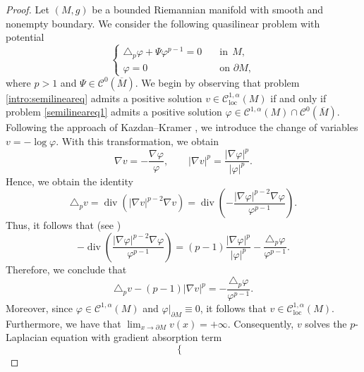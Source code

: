 \documentclass{article}
\begin{document}
\begin{proof} Let $(M,g)$ be a bounded Riemannian manifold with smooth and nonempty boundary.
We consider the following quasilinear problem with potential
\begin{equation}\label{semilineareq1}
\begin{cases}
\triangle_p \varphi + \Psi \varphi^{p-1} = 0 \quad & \text{in} \ \ M,\\
\varphi =0 & \text{on } \partial M,
\end{cases}
\end{equation}
where $p > 1$ and $\Psi \in \mathcal{C}^0(\overline{M})$. We begin by observing that problem \eqref{intro:semilineareq} admits a positive solution $v \in \mathcal{C}^{1,\alpha}_{\mathrm{loc}}(M)$ if and only if problem \eqref{semilineareq1} admits a positive solution $\varphi \in \mathcal{C}^{1,\alpha}(M)\cap \mathcal{C}^0(\overline{M})$. Following the approach of Kazdan--Kramer \cite{KazdanKramer}, we introduce the change of variables $v=-\log \varphi$. With this transformation, we obtain
\[
    \nabla v = -\frac{\nabla \varphi}{\varphi},
    \qquad 
    | \nabla v |^p = \frac{ |\nabla \varphi |^p}{|\varphi|^p}.
\]
Hence, we obtain the identity
    \begin{equation*}
    \triangle_p v 
    = \operatorname{div}( | \nabla v |^{p-2}\nabla v)
    = \operatorname{div}\!\left(
        -\frac{ |\nabla \varphi |^{p-2}\nabla \varphi}{\varphi^{p-1}}
      \right).
\end{equation*}
Thus, it follows that (see \cite[Remark 2.1]{LimaMontenegroSantos2010})
\begin{equation}\label{kazdamfonte}
    - \operatorname{div}\!\left( \frac{ |\nabla \varphi |^{p-2}\nabla \varphi}{\varphi^{p-1}}
      \right) =  (p-1) \dfrac{|\nabla \varphi |^p}{|\varphi|^p} - \frac{\triangle_p \varphi}{\varphi^{p-1}}.
\end{equation}
Therefore, we conclude that
\begin{equation*}
    \triangle_p v - (p-1)| \nabla v |^p 
    =  - \frac{\triangle_p \varphi}{\varphi^{p-1}}.
\end{equation*}
Moreover, since $\varphi \in \mathcal{C}^{1,\alpha}(M)$ and $\varphi|_{\partial M} \equiv 0$, it follows that $v \in \mathcal{C}^{1,\alpha}_{\mathrm{loc}}(M)$. Furthermore, we have that $\lim_{x \to \partial M} v(x) = +\infty$. Consequently, $v$ solves the $p$-Laplacian equation with gradient absorption term
\begin{equation}\label{intro:semilineareq2}
\begin{cases}

\end{cases}
\end{equation}
\end{proof}
\end{document}
